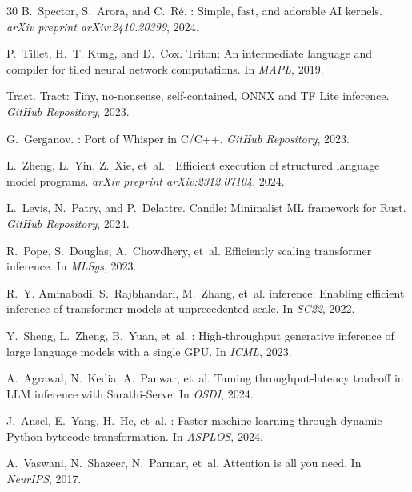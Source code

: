 \documentclass[11pt,twocolumn]{article}
\begin{document}
\begin{thebibliography}{30}
B.~Spector, S.~Arora, and C.~R\'e.
: Simple, fast, and adorable {AI} kernels.
\newblock \emph{arXiv preprint arXiv:2410.20399}, 2024.

P.~Tillet, H.~T. Kung, and D.~Cox.
\newblock Triton: An intermediate language and compiler for tiled neural network computations.
\newblock In \emph{MAPL}, 2019.

Tract.
\newblock Tract: Tiny, no-nonsense, self-contained, {ONNX} and {TF Lite} inference.
\newblock \emph{GitHub Repository}, 2023.

G.~Gerganov.
: Port of {Whisper} in {C/C++}.
\newblock \emph{GitHub Repository}, 2023.

L.~Zheng, L.~Yin, Z.~Xie, et~al.
: Efficient execution of structured language model programs.
\newblock \emph{arXiv preprint arXiv:2312.07104}, 2024.

L.~Levis, N.~Patry, and P.~Delattre.
\newblock Candle: Minimalist {ML} framework for {Rust}.
\newblock \emph{GitHub Repository}, 2024.

R.~Pope, S.~Douglas, A.~Chowdhery, et~al.
\newblock Efficiently scaling transformer inference.
\newblock In \emph{MLSys}, 2023.

R.~Y. Aminabadi, S.~Rajbhandari, M.~Zhang, et~al.
 inference: Enabling efficient inference of transformer models at unprecedented scale.
\newblock In \emph{SC22}, 2022.

Y.~Sheng, L.~Zheng, B.~Yuan, et~al.
: High-throughput generative inference of large language models with a single {GPU}.
\newblock In \emph{ICML}, 2023.

A.~Agrawal, N.~Kedia, A.~Panwar, et~al.
\newblock Taming throughput-latency tradeoff in {LLM} inference with {Sarathi-Serve}.
\newblock In \emph{OSDI}, 2024.

J.~Ansel, E.~Yang, H.~He, et~al.
: Faster machine learning through dynamic {Python} bytecode transformation.
\newblock In \emph{ASPLOS}, 2024.

A.~Vaswani, N.~Shazeer, N.~Parmar, et~al.
\newblock Attention is all you need.
\newblock In \emph{NeurIPS}, 2017.

\end{thebibliography}
\end{document}
